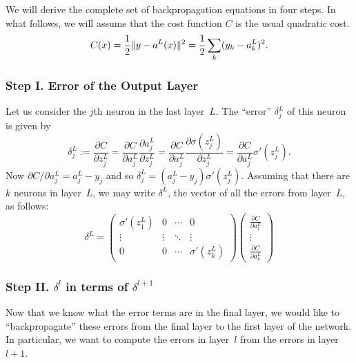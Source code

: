 We will derive the complete set of backpropagation equations in four steps. In what
follows, we will assume that the cost function $C$ is the usual quadratic cost.
\[
    C(x) = \frac{1}{2} \lVert y - a^L(x)\rVert^2 = \frac{1}{2} \sum_{k} (y_k - a_k^L)^2.
\]
\subsubsection{Step I. Error of the Output Layer}
Let us consider the $j$th neuron in the last layer~$L$. The ``error'' $\delta_j^L$
of this neuron is given by
\begin{equation}
\label{eqn:individual_error}
    \delta_j^L := \frac{\partial C}{\partial z_j^L}
    = \frac{\partial C}{\partial a_j^L} \frac{\partial a_j^L}{\partial z_j^L}
    = \frac{\partial C}{\partial a_j^L} \frac{\partial \sigma(z_j^L)}{\partial z_j^L}
    = \frac{\partial C}{\partial a_j^L} \sigma'(z_j^L).
\end{equation}
Now $\partial C / \partial a_j^L = a_j^L - y_j$ and so
$\delta_j^L = (a_j^L - y_j) \sigma'(z_j^L)$. Assuming that there are $k$ neurons
in layer~$L$, we may write $\delta^L$, the vector of all the errors from layer~$L$,
as follows:
\begin{equation}
    \delta^L =
    \begin{pmatrix}
        \sigma'(z_1^L)  & 0              & \cdots & 0 \\
        \vdots          & \vdots         & \ddots & \vdots  \\
        0               & 0              & \cdots & \sigma'(z_k^L)
    \end{pmatrix}
    \begin{pmatrix}
        \frac{\partial C}{\partial a_1^L} \\
        \vdots \\
        \frac{\partial C}{\partial a_k^L}
    \end{pmatrix}
\end{equation}

\subsubsection{Step II. $\delta^l$ in terms of $\delta^{l + 1}$}
Now that we know what the error terms are in the final layer, we would
like to ``backpropagate'' these errors from the final layer to the first layer
of the network. In particular, we want to compute the errors in
layer~$l$ from the errors in layer~$l + 1$.

